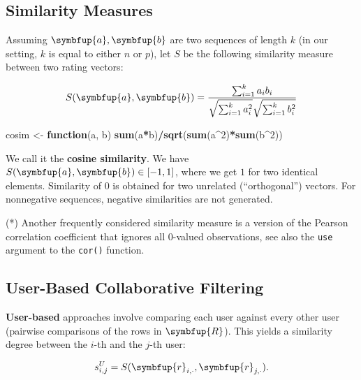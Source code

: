 \documentclass[10pt,b5paper,krantz1]{krantz}
\newenvironment{Shaded}{\begin{snugshade}}{\end{snugshade}}
\newcommand{\ControlFlowTok}[1]{\textcolor[rgb]{0.27,0.27,0.27}{\textbf{#1}}}
\newcommand{\DecValTok}[1]{\textcolor[rgb]{0.06,0.06,0.06}{#1}}
\newcommand{\KeywordTok}[1]{\textcolor[rgb]{0.27,0.27,0.27}{\textbf{#1}}}
\newcommand{\NormalTok}[1]{#1}
\newcommand{\OperatorTok}[1]{\textcolor[rgb]{0.43,0.43,0.43}{\textbf{#1}}}
\newcommand{\StringTok}[1]{\textcolor[rgb]{0.5,0.5,0.5}{#1}}
\renewcommand{\mathbf}[1]{\symbfup{#1}}
\renewenvironment{quote}{\begin{VF}}{\end{VF}}
\begin{document}
\hypertarget{similarity-measures}{%
\subsection{Similarity Measures}\label{similarity-measures}}

Assuming \(\mathbf{a},\mathbf{b}\) are two sequences of length \(k\)
(in our setting, \(k\) is equal to either \(n\) or \(p\)),
let \(S\) be the following similarity measure between two rating vectors:

\[
S(\mathbf{a},\mathbf{b}) = \frac{ \sum_{i=1}^k a_i b_i
}{
\sqrt{ \sum_{i=1}^k a_i^2 }
\sqrt{ \sum_{i=1}^k b_i^2 }
}
\]

\begin{Shaded}
\begin{Highlighting}[]
\NormalTok{cosim <-}\StringTok{ }\ControlFlowTok{function}\NormalTok{(a, b) }\KeywordTok{sum}\NormalTok{(a}\OperatorTok{*}\NormalTok{b)}\OperatorTok{/}\KeywordTok{sqrt}\NormalTok{(}\KeywordTok{sum}\NormalTok{(a}\OperatorTok{^}\DecValTok{2}\NormalTok{)}\OperatorTok{*}\KeywordTok{sum}\NormalTok{(b}\OperatorTok{^}\DecValTok{2}\NormalTok{))}
\end{Highlighting}
\end{Shaded}

We call it the \textbf{cosine similarity}.
We have \(S(\mathbf{a},\mathbf{b})\in[-1,1]\),
where we get \(1\) for two identical elements.
Similarity of 0 is obtained for two unrelated (``orthogonal'') vectors.
For nonnegative sequences, negative similarities are not generated.

\begin{quote}
(*) Another frequently considered similarity measure
is a version of the Pearson correlation coefficient that
ignores all \(0\)-valued observations,
see also the \texttt{use} argument to the \texttt{cor()} function.
\end{quote}

\hypertarget{user-based-collaborative-filtering}{%
\subsection{User-Based Collaborative Filtering}\label{user-based-collaborative-filtering}}

\textbf{User-based} approaches involve comparing each user against every other user
(pairwise comparisons of the rows in \(\mathbf{R}\)). This yields a similarity degree
between the \(i\)-th and the \(j\)-th user:

\[
s^U_{i,j} = S(\mathbf{r}_{i,\cdot},\mathbf{r}_{j,\cdot}).
\]
\end{document}
